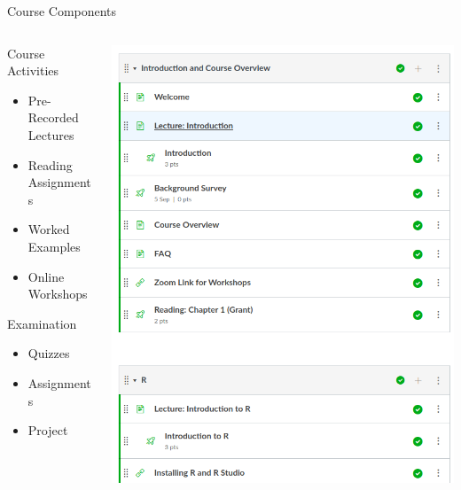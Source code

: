\begin{frame}{Course Components}
  \begin{columns}[c,onlytextwidth]
    \begin{column}{0.6\textwidth}
      \begin{block}{Course Activities}
        \begin{itemize}
          \item Pre-Recorded Lectures
          \item Reading Assignments
          \item Worked Examples
          \item Online Workshops
        \end{itemize}
      \end{block}
      \begin{block}{Examination}
        \begin{itemize}
          \item Quizzes
          \item Assignments
          \item Project
        \end{itemize}
      \end{block}
    \end{column}
    \begin{column}{0.4\textwidth}
      \includegraphics[width=\linewidth]{figures/components.png}
    \end{column}
  \end{columns}
\end{frame}

